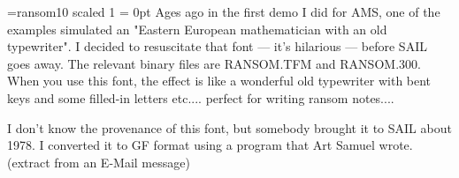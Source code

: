 \font\ran=ransom10 scaled 1%
\hsize 6in
\overfullrule = 0pt
\ran
Ages ago in the first demo I did for AMS, one of the examples
simulated an "Eastern European mathematician with an old typewriter".
I decided to resuscitate that font --- it's hilarious --- before SAIL
goes away. The relevant binary files are RANSOM.TFM and RANSOM.300.
When you use this font, the effect is like a wonderful old typewriter
with bent keys and some filled-in letters etc....  perfect for writing
ransom notes....

I don't know the provenance of this font, but somebody brought it to
SAIL about 1978. I converted it to GF format using a program that
Art Samuel wrote. 
(extract from an E-Mail message)

\bye